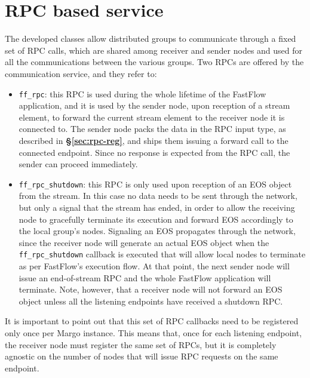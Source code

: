 \section{RPC based service}
The developed classes allow distributed groups to communicate through a fixed set of RPC calls, which are shared among receiver and sender nodes and used for all the communications between the various groups. Two RPCs are offered by the communication service, and they refer to:
\begin{itemize}
    \item \texttt{ff\_rpc}: this RPC is used during the whole lifetime of the FastFlow application, and it is used by the sender node, upon reception of a stream element, to forward the current stream element to the receiver node it is connected to. The sender node packs the data in the RPC input type, as described in \textbf{\S\ref{sec:rpc-reg}}, and ships them issuing a forward call to the connected endpoint. Since no response is expected from the RPC call, the sender can proceed immediately.
    \item \texttt{ff\_rpc\_shutdown}: this RPC is only used upon reception of an EOS object from the stream. In this case no data needs to be sent through the network, but only a signal that the stream has ended, in order to allow the receiving node to gracefully terminate its execution and forward EOS accordingly to the local group's nodes. Signaling an EOS propagates through the network, since the receiver node will generate an actual EOS object when the \texttt{ff\_rpc\_shutdown} callback is executed that will allow local nodes to terminate as per FastFlow's execution flow. At that point, the next sender node will issue an end-of-stream RPC and the whole FastFlow application will terminate. Note, however, that a receiver node will not forward an EOS object unless all the listening endpoints have received a shutdown RPC.
\end{itemize}

It is important to point out that this set of RPC callbacks need to be registered only once per Margo instance. This means that, once for each listening endpoint, the receiver node must register the same set of RPCs, but it is completely agnostic on the number of nodes that will issue RPC requests on the same endpoint. 

